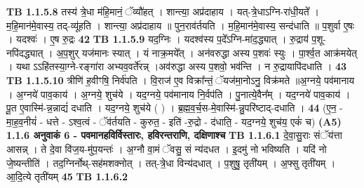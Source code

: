 \documentclass[17pt]{extarticle}
\begin{document}
                  \newline
                                \textbf{ TB 1.1.5.8} \newline
                  तस्य॑ त्रे॒धा म॑हि॒मानं॒ ॅव्यौ॑हत् । शान्त्या॒ अप्र॑दाहाय । यत्-त्रे॒धाऽग्नि-रा॑धी॒यते᳚ । म॒हि॒मान॑मे॒वास्य॒ तद्-व्यू॑हति । शान्त्या॒ अप्र॑दाहाय ॥ पुन॒राव॑र्तयति । म॒हि॒मान॑मे॒वास्य॒ सन्द॑धाति ॥ प॒शुर्वा ए॒षः । यदश्वः॑ । ए॒ष रु॒द्रः \textbf{ 42} \newline
                  \newline
                                \textbf{ TB 1.1.5.9} \newline
                  यद॒ग्निः । यदश्व॑स्य प॒दे᳚ऽग्नि-मा॑द॒द्ध्यात् । रु॒द्राय॑ प॒शू-नपि॑दद्ध्यात् । अ॒प॒शुर् यज॑मानः स्यात् । यं नाक्र॒मये᳚त् । अन॑वरुद्धा अस्य प॒शवः॑ स्युः । पा॒र्श्व॒त आक्र॑मयेत् । यथा ऽऽहि॑तस्या॒ग्ने-रङ्गा॑रा अभ्यव॒वर्ते॑रन्न् ।अव॑रुद्धा अस्य प॒शवो॒ भव॑न्ति । न रु॒द्रायापि॑दधाति । \textbf{ 43} \newline
                  \newline
                                \textbf{ TB 1.1.5.10} \newline
                  त्रीणि॑ ह॒वीꣳषि॒ निर्व॑पति । वि॒राज॑ ए॒व विक्रा᳚न्तं॒ ॅयज॑मा॒नोऽनु॒ विक्र॑मते ॥अ॒ग्नये॒ पव॑मानाय । अ॒ग्नये॑ पाव॒काय॑ । अ॒ग्नये॒ शुच॑ये । यद॒ग्नये॒ पव॑मानाय नि॒र्वप॑ति । पु॒नात्ये॒वैन᳚म् । यद॒ग्नये॑ पाव॒काय॑ । पू॒त ए॒वास्मि॑-न्न॒न्नाद्यं॑ दधाति । यद॒ग्नये॒ शुच॑ये ( ) । ब्र॒ह्म॒व॒र्च॒स-मे॒वास्मि॑-न्नु॒परि॑ष्टाद्-दधाति । \textbf{ 44} \newline
                  \newline
                                    (ए॒न॒ - मा॒ह॒व॒नीयं॑ - धत्ते - ऽश्व॒त्वं - ॅव॑र्तयति - कुरुत॒ - इति॑ -रु॒द्रो - द॑धाति॒ - यद॒ग्नये॒ शुच॑य॒ एकं॑ च) \textbf{(A5)} \newline \newline
                \textbf{ 1.1.6     अनुवाकं   6 - पवमानहविर्विस्तारः, हविरन्तराणि, दक्षिणाश्च} \newline
                                \textbf{ TB 1.1.6.1} \newline
                  दे॒वा॒सु॒राः संॅय॑त्ता आसन्न् । ते दे॒वा वि॑ज॒य-मु॑प॒यन्तः॑ । अ॒ग्नौ वा॒मं ॅवसु॒ सं न्य॑दधत । इ॒दमु॑ नो भविष्यति । यदि॑ नो जे॒ष्यन्तीति॑ । तद॒ग्निर्नोथ्-सह॑मशक्नोत् । तत्-त्रे॒धा विन्य॑दधात् । प॒शुषु॒ तृती॑यम् । अ॒फ्सु तृती॑यम् । आ॒दि॒त्ये तृती॑यम् \textbf{ 45} \newline
                  \newline
                                \textbf{ TB 1.1.6.2} \newline
\end{document}
